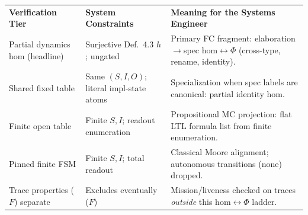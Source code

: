 \begingroup
\renewcommand{\arraystretch}{1.35}
\footnotesize
\begin{tabularx}{\textwidth}{@{}A{0.25\textwidth} A{0.20\textwidth} A{0.51\textwidth}@{}}
    \headingfont\bfseries Verification Tier & \headingfont\bfseries System Constraints & \headingfont\bfseries Meaning for the Systems Engineer \\
    \addlinespace[2pt]
    Partial dynamics hom (headline) & Surjective Def.~4.3 $h$; ungated & Primary FC fragment: elaboration$\to$spec hom$\leftrightarrow\Phi$ (cross-type, rename, identity). \\
    \addlinespace[2pt]
    Shared fixed table & Same $(S,I,O)$; literal impl-state atoms & Specialization when spec labels are canonical: partial identity hom. \\
    \addlinespace[2pt]
    Finite open table & Finite $S, I$; readout enumeration & Propositional MC projection: flat LTL formula list from finite enumeration. \\
    \addlinespace[2pt]
    Pinned finite FSM & Finite $S, I$; total readout & Classical Moore alignment; autonomous transitions ($\text{none}$) dropped. \\
    \addlinespace[2pt]
    Trace properties ($F$) separate & Excludes eventually ($F$) & Mission/liveness checked on traces \emph{outside} this hom$\leftrightarrow\Phi$ ladder. \\
\end{tabularx}
\label{tab:verification-tiers}
\endgroup
\vspace{6pt}
